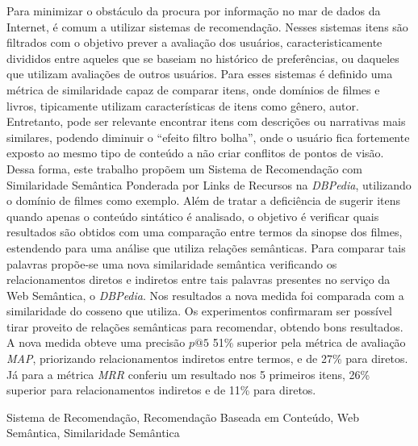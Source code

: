Para minimizar o obstáculo da procura por informação no mar de dados da Internet, é comum a utilizar sistemas de recomendação. Nesses sistemas itens são filtrados com o objetivo prever a avaliação dos usuários, caracteristicamente divididos entre aqueles que se baseiam no histórico de preferências, ou daqueles que utilizam avaliações de outros usuários. Para esses sistemas é definido uma métrica de similaridade capaz de comparar itens, onde domínios de filmes e livros, tipicamente utilizam características de itens como gênero, autor. Entretanto, pode ser relevante encontrar itens com descrições ou narrativas mais similares, podendo diminuir o \enquote{efeito filtro bolha}, onde o usuário fica fortemente exposto ao mesmo tipo de conteúdo a não criar conflitos de pontos de visão. Dessa forma, este trabalho propõem um Sistema de Recomendação com Similaridade Semântica Ponderada por Links de Recursos na \textit{DBPedia}, utilizando o domínio de filmes como exemplo. Além de tratar a deficiência de sugerir itens quando apenas o conteúdo sintático é analisado, o objetivo é verificar quais resultados são obtidos com uma comparação entre termos da sinopse dos filmes, estendendo para uma análise que utiliza relações semânticas. Para comparar tais palavras propõe-se uma nova similaridade semântica verificando os relacionamentos diretos e indiretos entre tais palavras presentes no serviço da Web Semântica, o \textit{DBPedia}. Nos resultados a nova medida foi comparada com a similaridade do cosseno que utiliza. Os experimentos confirmaram ser possível tirar proveito de relações semânticas para recomendar, obtendo bons resultados. A nova medida obteve uma precisão $p@5$ 51\% superior pela métrica de avaliação \textit{MAP}, priorizando relacionamentos indiretos entre termos, e de 27\% para diretos. Já para a métrica \textit{MRR} conferiu um resultado nos 5 primeiros itens, 26\% superior para relacionamentos indiretos e de 11\% para diretos.

\begin{keywords}
	Sistema de Recomendação, Recomendação Baseada em Conteúdo, Web Semântica, Similaridade Semântica
\end{keywords}